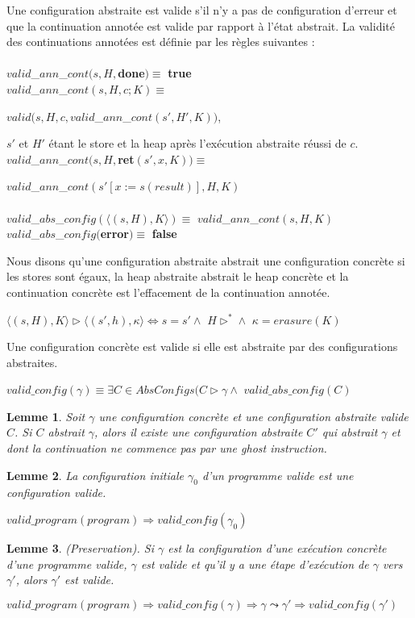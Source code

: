 \documentclass[11pt,openany]{article}
\newtheorem{lemme}{Lemme}
\begin{document}
		Une configuration abstraite est valide s'il n'y a pas de configuration d'erreur et que la continuation annot\'ee est valide par rapport \`a l'\'etat abstrait. La validit\'e des continuations annot\'ees est d\'efinie par les r\`egles suivantes :\\ \\  
		$valid$_$ann$_$cont(s,H,$\textbf{done}$) \equiv$ \textbf{true}\\
		$valid$_$ann$_$cont(s,H,c;K)\equiv$ \par
		$valid(s,H,c,valid$_$ann$_$cont(s',H',K))$,\par $s'$ et $H'$ \'etant le store et la heap apr\`es l'ex\'ecution abstraite r\'eussi de $c$.\\
		$valid$_$ann$_$cont(s,H,$\textbf{ret}$(s',x,K))\equiv$\par
		$valid$_$ann$_$cont(s'[x:=s(result)],H,K)$\\ \\
		$valid$_$abs$_$config(\langle (s,H),K\rangle)\equiv$ $valid$_$ann$_$cont(s,H,K)$\\
		$valid$_$abs$_$config($\textbf{error}$)\equiv$ \textbf{false}\\ \par 
		Nous disons qu'une configuration abstraite abstrait une configuration concr\`ete si les stores sont \'egaux, la heap abstraite abstrait le heap concr\`ete et la continuation concr\`ete est l'effacement de la continuation annot\'ee.
		\begin{center}
		$\langle (s,H),K\rangle\rhd\langle(s',h),\kappa\rangle\Leftrightarrow s=s'\land$ $H\rhd^*\land$ $\kappa = erasure(K)$
		\end{center}
		Une configuration concr\`ete est valide si elle est abstraite par des configurations abstraites.
		\begin{center}
		$valid\_config(\gamma)\equiv\exists C\in AbsConfigs (C\rhd\gamma\land$ $valid\_abs\_config(C)$
		\end{center}
		\begin{lemme}
			Soit $\gamma$ une configuration concr\`ete et une configuration abstraite valide $C$. Si $C$ abstrait $\gamma$, alors il existe une configuration abstraite $C'$ qui abstrait $\gamma$ et dont la continuation ne commence pas par une ghost instruction.
		\end{lemme}
		\begin{lemme}
			La configuration initiale $\gamma_0$ d'un programme valide est une configuration valide.
			\begin{center}
			$valid\_program(program)\Rightarrow valid\_config(\gamma_0)$
			\end{center}
		\end{lemme}
		\begin{lemme}
			(Preservation). Si $\gamma$ est la configuration d'une ex\'ecution concr\`ete d'une programme valide, $\gamma$ est valide et qu'il y a une \'etape d'ex\'ecution de $\gamma$ vers $\gamma '$, alors $\gamma '$ est valide.
			\begin{center}
			$valid\_program(program)\Rightarrow valid\_config(\gamma)\Rightarrow \gamma\leadsto\gamma '\Rightarrow valid\_config(\gamma ')$
			\end{center}
		\end{lemme}
	
\end{document}
